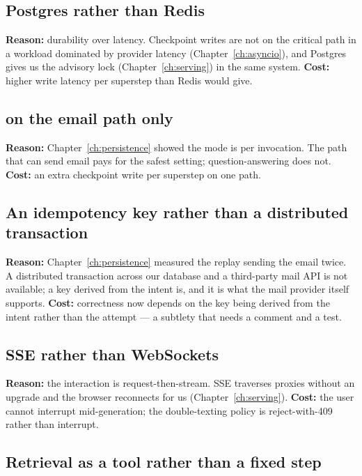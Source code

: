 \subsection{Postgres rather than Redis}

\textbf{Reason:} durability over latency. Checkpoint writes are not on the
critical path in a workload dominated by provider latency
(Chapter~\ref{ch:asyncio}), and Postgres gives us the advisory lock
(Chapter~\ref{ch:serving}) in the same system.
\textbf{Cost:} higher write latency per superstep than Redis would give.

\subsection{\texorpdfstring{}{durability sync} on the email path only}

\textbf{Reason:} Chapter~\ref{ch:persistence} showed the mode is per invocation.
The path that can send email pays for the safest setting; question-answering does
not.
\textbf{Cost:} an extra checkpoint write per superstep on one path.

\subsection{An idempotency key rather than a distributed transaction}

\textbf{Reason:} Chapter~\ref{ch:persistence} measured the replay sending the
email twice. A distributed transaction across our database and a third-party mail
API is not available; a key derived from the intent is, and it is what the mail
provider itself supports.
\textbf{Cost:} correctness now depends on the key being derived from the intent
rather than the attempt --- a subtlety that needs a comment and a test.

\subsection{SSE rather than WebSockets}

\textbf{Reason:} the interaction is request-then-stream. SSE traverses proxies
without an upgrade and the browser reconnects for us
(Chapter~\ref{ch:serving}).
\textbf{Cost:} the user cannot interrupt mid-generation; the double-texting
policy is reject-with-409 rather than interrupt.

\subsection{Retrieval as a tool rather than a fixed step}

